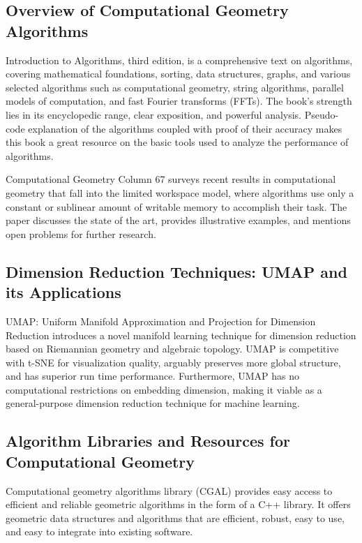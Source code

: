 \documentclass{article}
\begin{document}
\subsection{Overview of Computational Geometry Algorithms}

\cite{Cormen2009IntroductionTA} Introduction to Algorithms, third edition, is a comprehensive text on algorithms, covering mathematical foundations, sorting, data structures, graphs, and various selected algorithms such as computational geometry, string algorithms, parallel models of computation, and fast Fourier transforms (FFTs). The book's strength lies in its encyclopedic range, clear exposition, and powerful analysis. Pseudo-code explanation of the algorithms coupled with proof of their accuracy makes this book a great resource on the basic tools used to analyze the performance of algorithms.

\cite{Banyassady2018ComputationalGC} Computational Geometry Column 67 surveys recent results in computational geometry that fall into the limited workspace model, where algorithms use only a constant or sublinear amount of writable memory to accomplish their task. The paper discusses the state of the art, provides illustrative examples, and mentions open problems for further research.

\subsection{Dimension Reduction Techniques: UMAP and its Applications}

\cite{McInnes2018UMAPUM} UMAP: Uniform Manifold Approximation and Projection for Dimension Reduction introduces a novel manifold learning technique for dimension reduction based on Riemannian geometry and algebraic topology. UMAP is competitive with t-SNE for visualization quality, arguably preserves more global structure, and has superior run time performance. Furthermore, UMAP has no computational restrictions on embedding dimension, making it viable as a general-purpose dimension reduction technique for machine learning.

\subsection{Algorithm Libraries and Resources for Computational Geometry}

\cite{Alliez2008ComputationalGA} Computational geometry algorithms library (CGAL) provides easy access to efficient and reliable geometric algorithms in the form of a C++ library. It offers geometric data structures and algorithms that are efficient, robust, easy to use, and easy to integrate into existing software.
\end{document}
